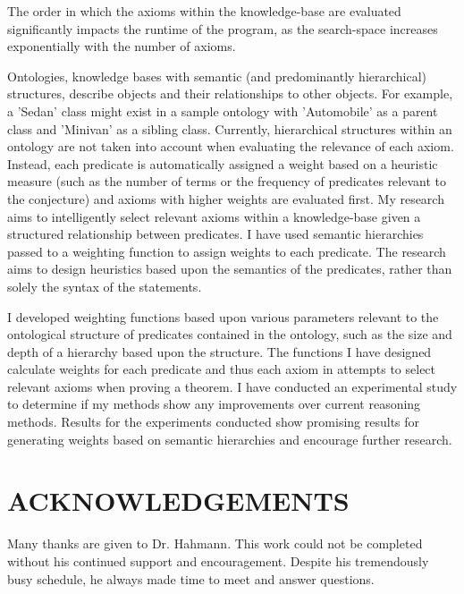 \documentclass{article}
\begin{document}
The order in which the axioms within the knowledge-base are evaluated significantly impacts the runtime of the program, as the search-space increases exponentially with the number of axioms. 

Ontologies, knowledge bases with semantic (and predominantly hierarchical) structures, describe objects and their relationships to other objects. For example, a 'Sedan' class might exist in a sample ontology with 'Automobile' as a parent class and 'Minivan' as a sibling class. Currently, hierarchical structures within an ontology are not taken into account when evaluating the relevance of each axiom. Instead, each predicate is automatically assigned a weight based on a heuristic measure (such as the number of terms or the frequency of predicates relevant to the conjecture) and axioms with higher weights are evaluated first. My research aims to intelligently select relevant axioms within a knowledge-base given a structured relationship between predicates. I have used semantic hierarchies passed to a weighting function to assign weights to each predicate. The research aims to design heuristics based upon the semantics of the predicates, rather than solely the syntax of the statements. 

I developed weighting functions based upon various parameters relevant to the ontological structure of predicates contained in the ontology, such as the size and depth of a hierarchy based upon the structure. The functions I have designed calculate weights for each predicate and thus each axiom in attempts to select relevant axioms when proving a theorem. I have conducted an experimental study to determine if my methods show any improvements over current reasoning methods. Results for the experiments conducted show promising results for generating weights based on semantic hierarchies and encourage further research. 
	
\setcounter{page}{3}
\newpage
{}
\vspace*{.05in}
\section*{\MakeUppercase{Acknowledgements}}
        
Many thanks are given to Dr. Hahmann. This work could not be completed without his continued support and encouragement. Despite his tremendously busy schedule, he always made time to meet and answer questions. 
\end{document}
